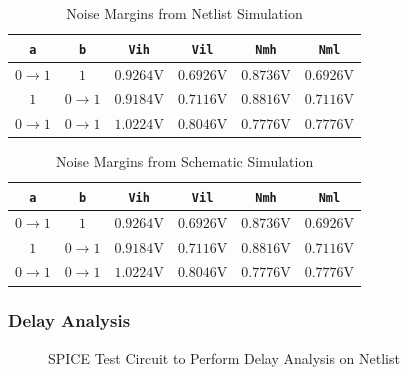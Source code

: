 \documentclass{article}
\begin{document}
	\begin{table}[H]
	\begin{center}
	\caption{Noise Margins from Netlist Simulation}
	\label{table::nand_gate_noise_analysis}
	\begin{tabular}{| c | c | c | c | c | c |}
		\hline
		\texttt{a} & \texttt{b} & \texttt{Vih} & \texttt{Vil} & \texttt{Nmh} & \texttt{Nml} \\
		\hline	
		$0 \rightarrow 1$ & $1$ & $0.9264 \text{V}$ & $0.6926 \text{V}$ & $0.8736 \text{V}$ & $0.6926 \text{V}$\\
		\hline	
		$1$ & $0 \rightarrow 1$ & $0.9184 \text{V}$ & $0.7116 \text{V}$ & $0.8816 \text{V}$ & $0.7116 \text{V}$\\
		\hline	
		$0 \rightarrow 1$ & $0 \rightarrow 1$ & $1.0224 \text{V}$ & $0.8046 \text{V}$ & $0.7776 \text{V}$ & $0.7776 \text{V}$\\
		\hline
	\end{tabular}
	\end{center}
	\end{table}
	
	\begin{table}[H]
	\begin{center}
	\caption{Noise Margins from Schematic Simulation}
	\label{table::nand_gate_noise_analysis_schem}
	\begin{tabular}{| c | c | c | c | c | c |}
		\hline
		\texttt{a} & \texttt{b} & \texttt{Vih} & \texttt{Vil} & \texttt{Nmh} & \texttt{Nml} \\
		\hline	
		$0 \rightarrow 1$ & $1$ & $0.9264 \text{V}$ & $0.6926 \text{V}$ & $0.8736 \text{V}$ & $0.6926 \text{V}$\\
		\hline	
		$1$ & $0 \rightarrow 1$ & $0.9184 \text{V}$ & $0.7116 \text{V}$ & $0.8816 \text{V}$ & $0.7116 \text{V}$\\
		\hline	
		$0 \rightarrow 1$ & $0 \rightarrow 1$ & $1.0224 \text{V}$ & $0.8046 \text{V}$ & $0.7776 \text{V}$ & $0.7776 \text{V}$\\
		\hline
	\end{tabular}
	\end{center}
	\end{table}
	
	\subsubsection{Delay Analysis}
	\begin{figure}[H]
		
		\caption{SPICE Test Circuit to Perform Delay Analysis on Netlist}
		\label{fig::nand_delay_analysis_test_circuit}
	\end{figure}
	
\end{document}

